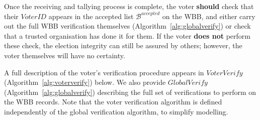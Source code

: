 \documentclass[12pt,a4paper]{article}
\theoremstyle{definition}
\newcommand{\VoterID}{\mathit{VoterID}}
\begin{document}
Once the receiving and tallying process is complete, the voter \textbf{should} check that their $\VoterID$ appears in the accepted list $\mathcal{B}^{accepted}$ on the WBB, and either carry out the full WBB verification themselves (Algorithm~\ref{alg:globalverify}) or check that a trusted organisation has done it for them. If the voter \textbf{does not} perform these check, the election integrity can still be assured by others; however, the voter themselves will have no certainty.

A full description of the voter's verification procedure appears in $\textit{VoterVerify}$ (Algorithm~\ref{alg:voterverify}) below. We also provide $\textit{GlobalVerify}$ (Algorithm~\ref{alg:globalverify}) describing the full set of verifications to perform on the WBB records. Note that the voter verification algorithm is defined independently of the global verification algorithm, to simplify modelling.
\end{document}
